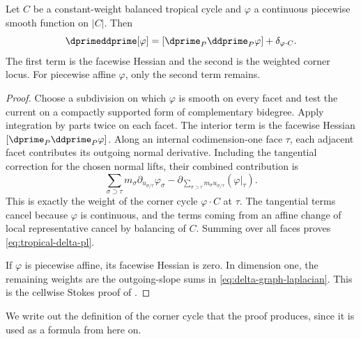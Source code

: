 \begin{proposition}\label{prop:tropical-delta-pl}
Let $C$ be a constant-weight balanced tropical cycle and $\varphi$ a
continuous piecewise smooth function on
$|C|$.  Then
\begin{equation}
 \dprimeddprime[\varphi]
    =[\dprime_P \ddprime_P\varphi]+\delta_{\varphi\cdot C}.
\label{eq:tropical-delta-pl}
\end{equation}
The first term is the facewise Hessian and the second is the weighted corner
locus.  For piecewise affine $\varphi$, only the second term remains.
\end{proposition}
\begin{proof}
Choose a subdivision on which $\varphi$ is smooth on every facet and test
the current on a compactly supported form of complementary bidegree.  Apply
integration by parts twice on each facet.  The interior term is the
facewise Hessian
$[\dprime_P\ddprime_P\varphi]$.  Along an internal codimension-one face
$\tau$, each adjacent facet contributes its outgoing normal derivative.
Including the tangential correction for the chosen normal lifts, their
combined contribution is
\[
       \sum_{\sigma\supset\tau}m_\sigma
          \partial_{u_{\sigma/\tau}}\varphi_\sigma
       -\partial_{\sum_{\sigma\supset\tau}m_\sigma u_{\sigma/\tau}}
          (\varphi|_\tau).
\]
This is exactly the weight of the corner cycle $\varphi\cdot C$ at $\tau$.
The tangential terms cancel because $\varphi$ is continuous, and the terms
coming from an affine change of local representative cancel by balancing of
$C$.  Summing over all faces proves \eqref{eq:tropical-delta-pl}.

If $\varphi$ is piecewise affine, its facewise Hessian is zero.  In dimension
one, the remaining weights are the outgoing-slope sums in
\eqref{eq:delta-graph-laplacian}.  This is the cellwise Stokes proof of
\cite[Theorem~3.16 and Corollary~3.19]{GK17}.
\end{proof}

We write out the definition of the corner cycle that the proof produces,
since it is used as a formula from here on.

